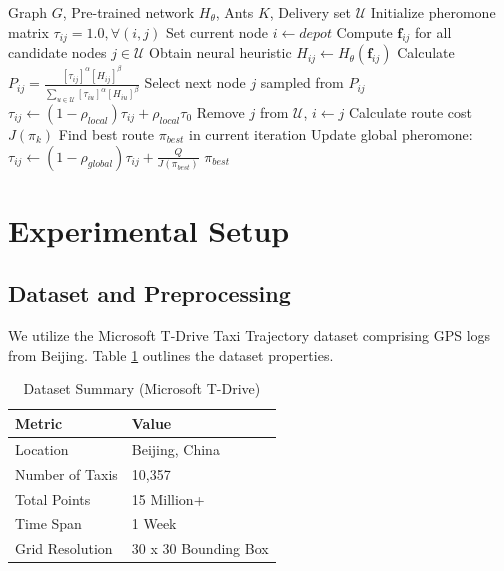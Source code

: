 \documentclass[conference]{IEEEtran}
\begin{document}
\begin{algorithm}
\caption{DeepACO Inference Algorithm}
\label{alg:deepaco}
\begin{algorithmic}[1]
\REQUIRE Graph $G$, Pre-trained network $H_{\theta}$, Ants $K$, Delivery set $\mathcal{U}$
\STATE Initialize pheromone matrix $\tau_{ij} = 1.0, \forall (i,j)$
        \STATE Set current node $i \leftarrow depot$
            \STATE Compute $\mathbf{f}_{ij}$ for all candidate nodes $j \in \mathcal{U}$
            \STATE Obtain neural heuristic $H_{ij} \leftarrow H_{\theta}(\mathbf{f}_{ij})$
            \STATE Calculate $P_{ij} = \frac{[\tau_{ij}]^\alpha [H_{ij}]^\beta}{\sum_{u \in \mathcal{U}} [\tau_{iu}]^\alpha [H_{iu}]^\beta}$
            \STATE Select next node $j$ sampled from $P_{ij}$
            \STATE $\tau_{ij} \leftarrow (1 - \rho_{local}) \tau_{ij} + \rho_{local} \tau_{0}$
            \STATE Remove $j$ from $\mathcal{U}$, $i \leftarrow j$
        \ENDWHILE
        \STATE Calculate route cost $J(\pi_k)$
    \ENDFOR
    \STATE Find best route $\pi_{best}$ in current iteration
    \STATE Update global pheromone: $\tau_{ij} \leftarrow (1 - \rho_{global}) \tau_{ij} + \frac{Q}{J(\pi_{best})}$
\ENDFOR
\RETURN $\pi_{best}$
\end{algorithmic}
\end{algorithm}

\section{Experimental Setup}
\label{sec:experimental_setup}

\subsection{Dataset and Preprocessing}
We utilize the Microsoft T-Drive Taxi Trajectory dataset \cite{tdrive} comprising GPS logs from Beijing. Table \ref{tab:dataset} outlines the dataset properties.

\begin{table}[htbp]
\centering
\caption{Dataset Summary (Microsoft T-Drive)}
\label{tab:dataset}
\begin{tabular}{@{}ll@{}}
\toprule
\textbf{Metric} & \textbf{Value} \\ \midrule
Location & Beijing, China \\
Number of Taxis & 10,357 \\
Total Points & 15 Million+ \\
Time Span & 1 Week \\
Grid Resolution & 30 x 30 Bounding Box \\ \bottomrule
\end{tabular}
\end{table}
\end{document}

